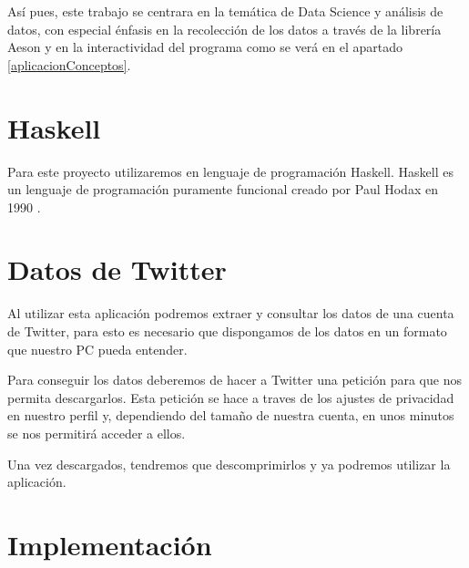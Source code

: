 \documentclass[11pt]{article}
\begin{document}
Así pues, este trabajo se centrara en la temática de Data Science y análisis de datos, con especial énfasis en la recolección de los datos a través de la librería Aeson \cite{Aeson} y en la interactividad del programa como se verá en el apartado \ref{aplicacionConceptos}.


\section{Haskell}
Para este proyecto utilizaremos en lenguaje de programación Haskell\cite{haskellweb}.
Haskell es un lenguaje de programación puramente funcional creado por Paul Hodax en 1990 \cite{origenhaskell}.


\section{Datos de Twitter}
Al utilizar esta aplicación podremos extraer y consultar los datos de una cuenta de Twitter, para esto es necesario que dispongamos de los datos en un formato que nuestro PC pueda entender.

Para conseguir los datos deberemos de hacer a Twitter una petición para que nos permita descargarlos. Esta petición se hace a traves de los ajustes de privacidad en nuestro perfil y, dependiendo del tamaño de nuestra cuenta, en unos minutos se nos permitirá acceder a ellos. \cite{twitterData}

Una vez descargados, tendremos que descomprimirlos y ya podremos utilizar la aplicación.

\section{Implementación}
\end{document}
